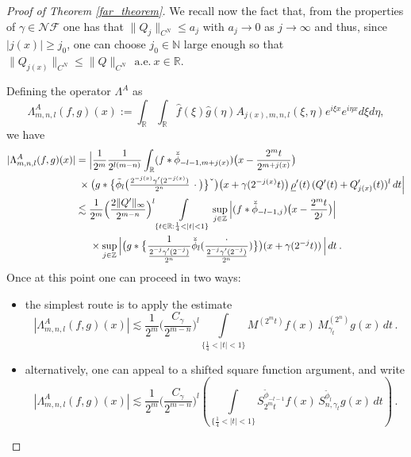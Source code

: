 \documentclass{amsart}
\newcommand{\R}{\mathbb{R}}
\newcommand{\Z}{\mathbb{Z}}
\newcommand{\N}{\mathbb{N}}
\newcommand{\g}{\gamma}
\newcommand{\NF}{\mathcal{NF}}
\theoremstyle{definition}
\theoremstyle{remark}
\numberwithin{equation}{section}
\begin{document}
\begin{proof}[Proof of Theorem \ref{far_theorem}]
We recall now the fact that, from the properties of $\g\in\NF$ one has that $\|Q_j\|_{C^N}\le a_j$ with $a_j\to 0$ as
$j\to\infty$ and thus, since $|j(x)|\geq j_0$, one can choose $j_0\in\N$ large enough so that $\|Q_{j(x)}\|_{C^N}\leq \|Q\|_{C^N}\:\:\textrm{a.e.}\:x\in\R$.

 Defining the operator $\Lambda^A$ as
\[
\Lambda^A_{m,n,l}(f,g)(x):=\int_\R\int_\R \hat{f}(\xi)\hat{g}(\eta) A_{j(x),m,n,l}(\xi,\eta)e^{i\xi x}e^{i\eta x}d\xi d \eta,
\]
we have
\begin{align}
|\Lambda^A_{m,n,l}(f,g)(x)|&=\Big|\frac{1}{2^m}\frac{1}{2^{l(m-n)}} \int_\R (f*\check{\tilde{\phi}}_{-l-1,m+j(x)})\big(x-\frac{2^mt}{2^{m+j(x)}}\big)\label{sqv}\\
&\hspace{.1cm}\times \big(g*\big\{\tilde{\phi}_l\big(\tfrac{2^{-j(x)}\gamma'(2^{-j(x)})}{2^n}\,\cdot\big)\big\} \check{\phantom{1}}\big)\big(x+\gamma(2^{-j(x)}t)\big) \,\underline{\rho}'(t)\,(Q'(t)+Q'_{j(x)}(t))^l\, dt\Big|\nonumber\\
&\lesssim \frac{1}{2^m}\Big(\frac{2\|Q'\|_\infty}{2^{m-n}}\Big)^l \int\limits_{\{t\in\R:\frac{1}{4} <|t|<1 \}}
\sup_{j\in\Z}\Big|(f*\check{\tilde{\phi}}_{-l-1,j})\big(x-\frac{2^mt}{2^j}\big)\Big| \nonumber\\
&\hspace{.5cm}\times
\sup_{j\in\Z}\Big|\big(g*\big\{\frac{1}{\tfrac{2^{-j}\gamma'(2^{-j})}{2^n}} \check{\tilde{\phi}}_l (\frac{\cdot}{\tfrac{2^{-j}\gamma'(2^{-j})}{2^n}})\big\}\big) (x+\gamma(2^{-j}t))\,\Big|\,dt\nonumber\:.
\end{align}
Once at this point one can proceed in two ways:
\begin{itemize}
\item the simplest route is to apply the estimate
\begin{equation}\label{mv}
|\Lambda^A_{m,n,l}(f,g)(x)|\lesssim \frac{1}{2^m}\Big(\frac{C_{\g}}{2^{m-n}}\Big)^l \int\limits_{\{\frac{1}{4} <|t|<1 \}} M^{(2^m t)}f(x)\,M^{(2^n)}_{\g_t} g(x)\,dt\,.
\end{equation}
\item alternatively, one can appeal to a shifted square function argument, and write
\begin{equation}\label{sv}
|\Lambda^A_{m,n,l}(f,g)(x)|\lesssim \frac{1}{2^m}\Big(\frac{C_{\g}}{2^{m-n}}\Big)^l \left(\int\limits_{\{\frac{1}{4} <|t|<1 \}} S_{2^mt}^{\tilde{\phi}_{-l-1}}f(x)\,S_{n,\g_t}^{\tilde{\phi}_l}g(x)\,dt\right)\,.
\end{equation}
\end{itemize}





\end{proof}
\end{document}
